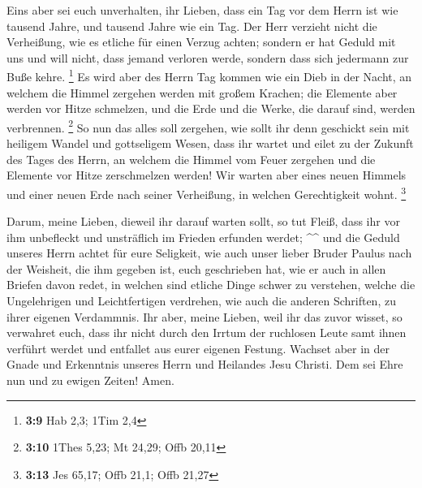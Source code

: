  Eins aber sei euch unverhalten, ihr Lieben, dass ein Tag
vor dem Herrn ist wie tausend Jahre, und tausend Jahre wie ein Tag.
 Der Herr verzieht nicht die Verheißung, wie es etliche für
einen Verzug achten; sondern er hat Geduld mit uns und will nicht, dass
jemand verloren werde, sondern dass sich jedermann zur Buße kehre.
\footnote{\textbf{3:9} Hab 2,3; 1Tim 2,4}  Es wird aber des
Herrn Tag kommen wie ein Dieb in der Nacht, an welchem die Himmel
zergehen werden mit großem Krachen; die Elemente aber werden vor Hitze
schmelzen, und die Erde und die Werke, die darauf sind, werden
verbrennen. \footnote{\textbf{3:10} 1Thes 5,23; Mt 24,29; Offb 20,11}
 So nun das alles soll zergehen, wie sollt ihr denn
geschickt sein mit heiligem Wandel und gottseligem Wesen, 
dass ihr wartet und eilet zu der Zukunft des Tages des Herrn, an welchem
die Himmel vom Feuer zergehen und die Elemente vor Hitze zerschmelzen
werden!  Wir warten aber eines neuen Himmels und einer
neuen Erde nach seiner Verheißung, in welchen Gerechtigkeit wohnt.
\footnote{\textbf{3:13} Jes 65,17; Offb 21,1; Offb 21,27}

 Darum, meine Lieben, dieweil ihr darauf warten sollt, so
tut Fleiß, dass ihr vor ihm unbefleckt und unsträflich im Frieden
erfunden werdet; \^{}\^{}  und die Geduld unseres Herrn
achtet für eure Seligkeit, wie auch unser lieber Bruder Paulus nach der
Weisheit, die ihm gegeben ist, euch geschrieben hat,  wie
er auch in allen Briefen davon redet, in welchen sind etliche Dinge
schwer zu verstehen, welche die Ungelehrigen und Leichtfertigen
verdrehen, wie auch die anderen Schriften, zu ihrer eigenen Verdammnis.
 Ihr aber, meine Lieben, weil ihr das zuvor wisset, so
verwahret euch, dass ihr nicht durch den Irrtum der ruchlosen Leute samt
ihnen verführt werdet und entfallet aus eurer eigenen Festung.
 Wachset aber in der Gnade und Erkenntnis unseres Herrn und
Heilandes Jesu Christi. Dem sei Ehre nun und zu ewigen Zeiten! Amen.
